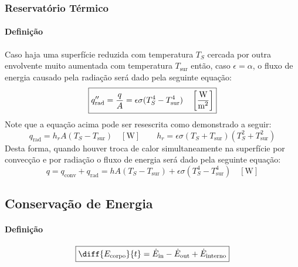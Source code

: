 \documentclass{article}
\begin{document}
        \subsubsection{Reservatório Térmico}
            \paragraph{Definição}Caso haja uma superfície reduzida com temperatura $T_{S}$ cercada por outra envolvente muito aumentada com temperatura $T_{\text{sur}}$ então, caso $\epsilon = \alpha$, o fluxo de energia causado pela radiação será dado pela seguinte equação:
                \begin{equation}
                    \boxed{
                        q_{\text{rad}}'' = \frac{q}{A} = \epsilon\sigma(T_{S}^{4} - T_{\text{sur}}^{4}) 
                        \quad 
                        \left[\frac{\text{W}}{\text{m\textsuperscript{2}}}\right]
                    }
                \end{equation}
            Note que a equação acima pode ser resescrita como demonstrado a seguir:
                \begin{equation}
                    \boxed{
                        q_{\text{rad}} = h_{r} A (T_{S} - T_{\text{sur}}) 
                        \quad 
                        [\text{W}]
                    }
                    \qquad
                    \boxed{
                        h_{r} = \epsilon \sigma (T_{S} + T_{\text{sur}})(T_{S}^{2} + T_{\text{sur}}^{2})
                    }
                \end{equation}
            Desta forma, quando houver troca de calor simultaneamente na superfície por convecção e por radiação o fluxo de energia será dado pela seguinte equação:
                \begin{equation}
                    \boxed{
                        q = q_{\text{conv}} + q_{\text{rad}} = 
                        h A (T_{S} - T_{\text{sur}}) + \epsilon\sigma(T_{S}^{4} - T_{\text{sur}}^{4}) 
                        \quad 
                        [\text{W}]
                    }
                \end{equation}

        \subsection{Conservação de Energia}
            \paragraph{Definição}
                \begin{equation}
                    \boxed{
                        \diff{E_{\text{corpo}}}{t} = \dot{E}_{\text{in}} - \dot{E}_{\text{out}} + \dot{E}_{\text{interno}}
                    }
                \end{equation}
\end{document}
